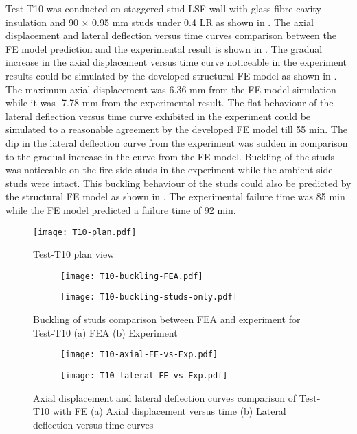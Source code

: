 Test-T10 was conducted on staggered stud LSF wall with glass fibre cavity insulation and 90 $\times$ 0.95 mm studs under 0.4 LR as shown in . The axial displacement and lateral deflection versus time curves comparison between the FE model prediction and the experimental result is shown in . The gradual increase in the axial displacement versus time curve noticeable in the experiment results could be simulated by the developed structural FE model as shown in . The maximum axial displacement was 6.36 mm from the FE model simulation while it was -7.78 mm from the experimental result. The flat behaviour of the lateral deflection versus time curve exhibited in the experiment could be simulated to a reasonable agreement by the developed FE model till 55 min. The dip in the lateral deflection curve from the experiment was sudden in comparison to the gradual increase in the curve from the FE model. Buckling of the studs was noticeable on the fire side studs in the experiment while the ambient side studs were intact. This buckling behaviour of the studs could also be predicted by the structural FE model as shown in . The experimental failure time was 85 min while the FE model predicted a failure time of 92 min.
\begin{figure}[!htbp]
	\centering
			\texttt{[image: T10-plan.pdf]}\\
		\caption{Test-T10 plan view}
		\label{fig:T10-plan-FEA}
\end{figure}
\begin{figure}[!htbp]
	\centering
	\begin{subfigure}[b]{0.8\textwidth}
		\centering
		\texttt{[image: T10-buckling-FEA.pdf]}
		\caption{}
		\label{subfig:T10-buckling-FEA}
	\end{subfigure}
	\begin{subfigure}[b]{0.5\textwidth}
		\centering
		\texttt{[image: T10-buckling-studs-only.pdf]}
		\caption{}
		\label{subfig:T10-buckling-FEA-Exp}
	\end{subfigure}
	   \caption{Buckling of studs comparison between FEA and experiment for Test-T10 (a) FEA (b) Experiment}
	   \label{fig:T10-buckling-FE-vs-Exp}
\end{figure} 
\begin{figure}[!htbp]
	\centering
	\begin{subfigure}[b]{0.45\textwidth}
		\centering
		\texttt{[image: T10-axial-FE-vs-Exp.pdf]}
		\caption{}
		\label{subfig:T10-axial-FE-vs-Exp}
	\end{subfigure}
	\begin{subfigure}[b]{0.45\textwidth}
		\centering
		\texttt{[image: T10-lateral-FE-vs-Exp.pdf]}
		\caption{}
		\label{subfig:T10-lateral-FE-vs-Exp}
	\end{subfigure}
	   \caption{Axial displacement and lateral deflection curves comparison of Test-T10 with FE (a) Axial displacement versus time (b) Lateral deflection versus time curves}
	   \label{fig:T10-structural-FE-vs-Exp}
\end{figure} 
